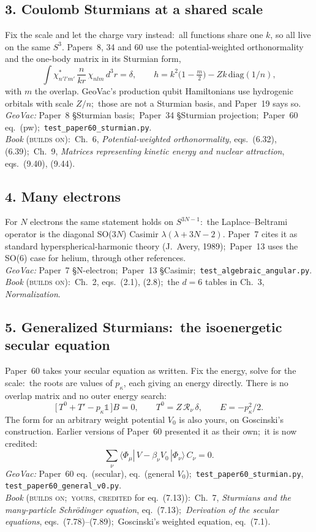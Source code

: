 \documentclass[11pt]{article}
\newcommand{\tst}[1]{\nolinkurl{#1}}
\newcommand{\rel}[1]{\textsc{#1}}
\newcommand{\bk}[1]{\textit{#1}}
\begin{document}
\subsection*{3. Coulomb Sturmians at a shared scale}
Fix the scale and let the charge vary instead:\ all functions share one
$k$, so all live on the same $S^3$. Papers~8, 34 and 60 use the
potential-weighted orthonormality and the one-body matrix in its Sturmian
form,
\[
\int \chi^*_{n'l'm'}\,\frac{n}{kr}\,\chi_{nlm}\,d^3r=\delta,\qquad
h = k^2\bigl(1-\tfrac{m}{2}\bigr) - Zk\,\mathrm{diag}(1/n),
\]
with $m$ the overlap. GeoVac's production qubit Hamiltonians use hydrogenic
orbitals with scale $Z/n$;\ those are not a Sturmian basis, and Paper~19
says so.\\
\emph{GeoVac:} Paper~8 \S Sturmian basis;\ Paper~34 \S Sturmian
projection;\ Paper~60 eq.~(pw);\ \tst{test_paper60_sturmian.py}.\\
\emph{Book} (\rel{builds on}):\ Ch.~6, \bk{Potential-weighted
orthonormality}, eqs.~(6.32), (6.39);\ Ch.~9, \bk{Matrices representing
kinetic energy and nuclear attraction}, eqs.~(9.40), (9.44).

\subsection*{4. Many electrons}
For $N$ electrons the same statement holds on $S^{3N-1}$:\ the
Laplace--Beltrami operator is the diagonal SO($3N$) Casimir
$\lambda(\lambda+3N-2)$. Paper~7 cites it as standard hyperspherical-harmonic
theory (J.~Avery, 1989);\ Paper~13 uses the SO(6) case for helium, through
other references.\\
\emph{GeoVac:} Paper~7 \S N-electron;\ Paper~13 \S Casimir;\
\tst{test_algebraic_angular.py}.\\
\emph{Book} (\rel{builds on}):\ Ch.~2, eqs.~(2.1), (2.8);\ the $d=6$
tables in Ch.~3, \bk{Normalization}.

\subsection*{5. Generalized Sturmians:\ the isoenergetic secular equation}
Paper~60 takes your secular equation as written. Fix the energy, solve for
the scale:\ the roots are values of $p_\kappa$, each giving an energy
directly. There is no overlap matrix and no outer energy search:
\[
\bigl[\,T^0 + T' - p_\kappa \mathbb{1}\,\bigr]B = 0,\qquad
T^0 = Z\,\mathcal{R}_\nu\,\delta,\qquad E=-p_\kappa^2/2 .
\]
The form for an arbitrary weight potential $V_0$ is also yours, on
Goscinski's construction. Earlier versions of Paper~60 presented it as
their own;\ it is now credited:
\[
\sum_\nu \langle \Phi_\mu|\,V-\beta_\nu V_0\,|\Phi_\nu\rangle\, C_\nu = 0 .
\]
\emph{GeoVac:} Paper~60 eq.~(secular), eq.~(general $V_0$);\
\tst{test_paper60_sturmian.py}, \tst{test_paper60_general_v0.py}.\\
\emph{Book} (\rel{builds on};\ \rel{yours, credited} for eq.~(7.13)):\
Ch.~7, \bk{Sturmians and the many-particle Schr\"odinger equation},
eq.~(7.13);\ \bk{Derivation of the secular equations}, eqs.~(7.78)--(7.89);\
Goscinski's weighted equation, eq.~(7.1).
\end{document}
